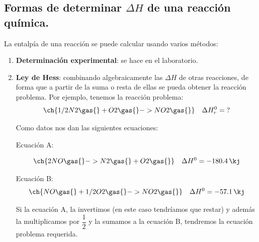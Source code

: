 \subsection{Formas de determinar \texorpdfstring{\(\Delta H\)}{H} de una reacción química.}\label{subsec:formas-de-determinar-texorpdfstring{(delta-h)}{h}-de-una-reaccion-quimica.}

La entalpía de una reacción se puede calcular usando varios métodos:

\begin{enumerate}[label=\numberballmDarkTeal]
        \item \textbf{Determinación experimental}: se hace en el laboratorio.
        \item \textbf{Ley de Hess}: combinando algebraicamente las \(\Delta H\) de otras reacciones, de forma que a partir de la suma o resta de ellas se pueda obtener la reacción problema.
        Por ejemplo, tenemos la reacción problema:
        \begin{equation*}
            \ch{1/2 N2 \gas{} + O2 \gas{} -> NO2 \gas{}}\quad  \Delta H^0_r = \text{?}
        \end{equation*}

        Como datos nos dan las siguientes ecuaciones:

        Ecuación A:

        \begin{equation*}
            \ch{2 NO \gas{}  -> N2 \gas{} + O2 \gas{}} \quad  \Delta H^0 = \SI{-180.4}{\kj}
        \end{equation*}

        Ecuación B:
        \begin{equation*}
            \ch{ NO \gas{} + 1/2 O2 \gas{} -> NO2 \gas{}} \quad  \Delta H^0 = \SI{-57.1}{\kj}
        \end{equation*}

        Si la ecuación A, la invertimos (en este caso tendríamos que restar) y además la multiplicamos por \( \dfrac{1}{2} \) y la sumamos a la ecuación B, tendremos la ecuación problema requerida.


\end{enumerate}
